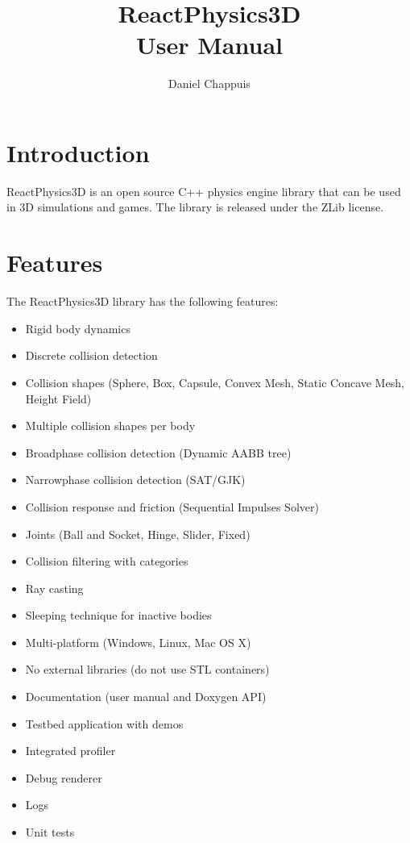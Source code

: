 \documentclass[a4paper,12pt]{article}
\begin{document}
   \author{Daniel Chappuis}
   \title{ReactPhysics3D \\ User Manual}
   \maketitle

   \tableofcontents

   \newpage


   \section{Introduction}

  ReactPhysics3D is an open source C++ physics engine library that can be used
  in 3D simulations and games. The library is released under the ZLib license.

   \section{Features}

   The ReactPhysics3D library has the following features:

   \begin{itemize}
    \item Rigid body dynamics
    \item Discrete collision detection
    \item Collision shapes (Sphere, Box, Capsule, Convex Mesh, Static Concave Mesh, Height Field)
    \item Multiple collision shapes per body
    \item Broadphase collision detection (Dynamic AABB tree)
    \item Narrowphase collision detection (SAT/GJK)
    \item Collision response and friction (Sequential Impulses Solver)
    \item Joints (Ball and Socket, Hinge, Slider, Fixed)
    \item Collision filtering with categories
    \item Ray casting
    \item Sleeping technique for inactive bodies
    \item Multi-platform (Windows, Linux, Mac OS X)
    \item No external libraries (do not use STL containers)
    \item Documentation (user manual and Doxygen API)
    \item Testbed application with demos
    \item Integrated profiler
    \item Debug renderer
    \item Logs
    \item Unit tests
   \end{itemize}
\end{document}
